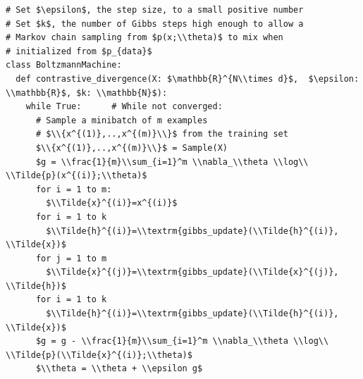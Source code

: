 \documentclass[border=10pt]{standalone}
\begin{document}
\begin{lstlisting}
# Set $\epsilon$, the step size, to a small positive number
# Set $k$, the number of Gibbs steps high enough to allow a 
# Markov chain sampling from $p(x;\\theta)$ to mix when 
# initialized from $p_{data}$      
class BoltzmannMachine:
  def contrastive_divergence(X: $\mathbb{R}^{N\\times d}$,  $\epsilon: \\mathbb{R}$, $k: \\mathbb{N}$):
    while True:      # While not converged:
      # Sample a minibatch of m examples 
      # $\\{x^{(1)},..,x^{(m)}\\}$ from the training set
      $\\{x^{(1)},..,x^{(m)}\\}$ = Sample(X)
      $g = \\frac{1}{m}\\sum_{i=1}^m \\nabla_\\theta \\log\\ \\Tilde{p}(x^{(i)};\\theta)$
      for i = 1 to m:
        $\\Tilde{x}^{(i)}=x^{(i)}$
      for i = 1 to k 
        $\\Tilde{h}^{(i)}=\\textrm{gibbs_update}(\\Tilde{h}^{(i)}, \\Tilde{x})$
      for j = 1 to m 
        $\\Tilde{x}^{(j)}=\\textrm{gibbs_update}(\\Tilde{x}^{(j)}, \\Tilde{h})$
      for i = 1 to k 
        $\\Tilde{h}^{(i)}=\\textrm{gibbs_update}(\\Tilde{h}^{(i)}, \\Tilde{x})$
      $g = g - \\frac{1}{m}\\sum_{i=1}^m \\nabla_\\theta \\log\\ \\Tilde{p}(\\Tilde{x}^{(i)};\\theta)$
      $\\theta = \\theta + \\epsilon g$
\end{lstlisting}
\end{document}
